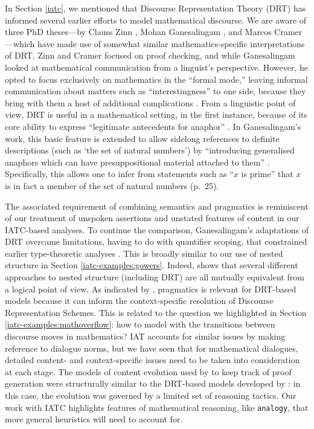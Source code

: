 \documentclass[smallextended,oneside]{svjour3}       %
\let\cite\citep
\begin{document}
In Section \ref{iatc}, we mentioned that Discourse Representation
Theory (DRT) has informed several earlier efforts to model
mathematical discourse.  We are aware of three PhD theses---by Clauss
Zinn \citeyearpar{zinn2004understanding}, Mohan Ganesalingam
\citeyearpar{ganesalingam2013language}, and Marcos Cramer
\citeyearpar{cramer2013proof}---which have made use of somewhat similar
mathematics-specific interpretations of DRT.  Zinn and Cramer
focused on proof checking, and while Ganesalingam looked
at mathematical communication from a linguist's perspective.  However,
he opted to focus exclusively on mathematics in the ``formal mode,''
leaving informal communication about matters such as
``interestingness'' to one side, because they bring with them a
host of additional complications \cite[pp.~7--8]{ganesalingam2013language}.
From a linguistic point of view, DRT is useful in a mathematical setting, in the first instance,
because of its core ability to express ``legitimate antecedents for anaphor''
\cite[p.~50]{ganesalingam2013language}.
In Ganesalingam's work, this basic feature is extended to allow
sidelong references to definite descriptions
(such as `the set of natural numbers')
by ``introducing generalised anaphors which can have presuppositional material
attached to them''
\cite[pp.~25, 237]{ganesalingam2013language}.
Specifically, this allows one to infer from statements such as
``$x$ is prime'' that $x$ is in fact a member of the set of natural numbers (p.~25). 

The associated requirement of combining semantics and pragmatics \cite[p.~336]{doi:10.1093/jos/9.4.333}
is reminiscent of our treatment of unspoken assertions
and unstated features of content in our IATC-based analyses.
To continue the comparison, Ganesalingam's adaptations of DRT
overcame limitations, having to do with quantifier scoping, that constrained
earlier type-theoretic analyses \cite[pp.~81--82]{ganesalingam2013language}.
This is broadly similar to our use of nested structure in Section \ref{iatc-examples:gowers}.
Indeed, \citet{sowa2000knowledge} shows that several different approaches
to nested structure (including DRT)
are all mutually equivalent from a logical point of view.
As indicated by
\citet{doi:10.1093/jos/9.4.333},
pragmatics is relevant for DRT-based models
because it can inform the context-specific resolution of Discourse
Representation Schemes.  This is related to
the question we highlighted in Section \ref{iatc-examples:mathoverflow}:
how to model with the transitions between discourse moves in mathematics?
IAT accounts for similar issues by making reference to dialogue norms,
but we have seen that for mathematical dialogues,
detailed content- and context-specific issues need to be
taken into consideration at each stage.
The models of content evolution used by
\citet{ganesalingam2016fully} to keep track of proof generation were
structurally similar to the DRT-based models developed by
\citet{ganesalingam2013language}: in this case, the evolution was
governed by a limited set of reasoning tactics.  Our work with IATC highlights 
features of mathematical reasoning, like \texttt{analogy}, that more
general heuristics will need to account for.
\end{document}
